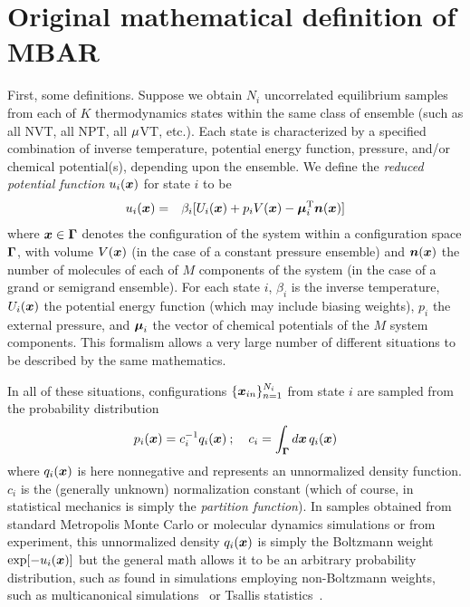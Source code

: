 \documentclass[aps,pre,twocolumn,superscriptaddress]{revtex4-1}
\newcommand{\bfv}[1]{{\mbox{\boldmath{$#1$}}}}
\newcommand{\bfm}[1]{{\bf #1}}
\newcommand{\x}{\bfv{x}}
\newcommand{\T}{\mathrm{T}}                                %
\begin{document}
\section{Original mathematical definition of MBAR}

First, some definitions. Suppose we obtain $N_i$ uncorrelated
equilibrium samples~\cite{MLEmeasure_foot2} from each of $K$
thermodynamics states within the same class of ensemble (such as all
NVT, all NPT, all $\bfm{\mu}$VT, etc.).  Each state is characterized
by a specified combination of inverse temperature, potential energy
function, pressure, and/or chemical potential(s), depending upon the
ensemble.  We define the \emph{reduced potential function} $u_i(\x)$
for state $i$ to be
\begin{eqnarray}
u_i(\x) &=& \beta_i [ U_i(\x) + p_i V(\x) - \bfv{\mu}_i^\T \bfv{n}(\x) ] \label{equation:reduced-potential}
\end{eqnarray}
where $\x \in \bfm{\Gamma}$ denotes the configuration of the system
within a configuration space $\bfm{\Gamma}$, with volume $V(\x)$ (in
the case of a constant pressure ensemble) and $\bfv{n}(\x)$ the number
of molecules of each of $M$ components of the system (in the case of a
grand or semigrand ensemble).  For each state $i$, $\beta_i$ is the
inverse temperature, $U_i(\x)$ the potential energy function (which
may include biasing weights), $p_i$ the external pressure, and
$\bfv{\mu}_i$ the vector of chemical potentials of the $M$ system
components.  This formalism allows a very large number of different
situations to be described by the same mathematics.

In all of these situations, configurations $\{\x_{in}\}_{n=1}^{N_i}$
from state $i$ are sampled from the probability distribution
\begin{eqnarray}
p_i(\x) = c_i^{-1} q_i(\x) \: &;& \: c_i = \int_{\bfm{\Gamma}} d\x \, q_i(\x)
\end{eqnarray}
where $q_i(\x)$ is here nonnegative and represents an unnormalized
density function. $c_i$ is the (generally unknown) normalization
constant (which of course, in statistical mechanics is simply the
\emph{partition function}). In samples obtained from standard
Metropolis Monte Carlo or molecular dynamics simulations or from
experiment, this unnormalized density $q_i(\x)$ is simply the
Boltzmann weight $\exp[-u_i(\x)]$ but the general math allows it to be
an arbitrary probability distribution, such as found in simulations
employing non-Boltzmann weights, such as multicanonical
simulations~\cite{mezei:j-comp-phys:1987:muca} or Tsallis
statistics~\cite{tsallis:j-stat-phys:1988:tsallis-statistics}.
\end{document}
